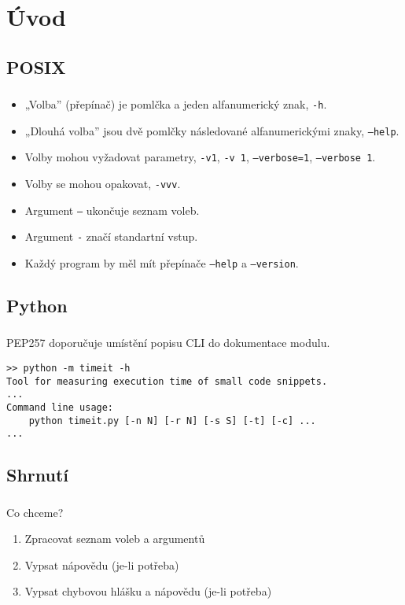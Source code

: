 \section{Úvod}
\subsection{POSIX}
\begin{frame}
\frametitle{\insertsection}
\framesubtitle{\insertsubsection}

\begin{itemize}[<+->]
\item „Volba” (přepínač) je pomlčka a jeden alfanumerický znak, \texttt{-h}.
\item „Dlouhá volba” jsou dvě pomlčky následované alfanumerickými znaky, \texttt{--help}.
\item Volby mohou vyžadovat parametry, \texttt{-v1}, \texttt{-v 1}, \texttt{--verbose=1}, \texttt{--verbose 1}.
\item Volby se mohou opakovat, \texttt{-vvv}.
\item Argument \texttt{--} ukončuje seznam voleb.
\item Argument \texttt{-} značí standartní vstup.
\item Každý program by měl mít přepínače \texttt{--help} a \texttt{--version}.
\end{itemize}
\end{frame}

\subsection{Python}
\begin{frame}[fragile]
\frametitle{\insertsection}
\framesubtitle{\insertsubsection}
PEP257 doporučuje umístění popisu CLI do dokumentace modulu.

\begin{verbatim}
>> python -m timeit -h
Tool for measuring execution time of small code snippets.
...
Command line usage:
    python timeit.py [-n N] [-r N] [-s S] [-t] [-c] ...
...
\end{verbatim}
\end{frame}

\subsection{Shrnutí}
\begin{frame}
\frametitle{\insertsection}
\framesubtitle{\insertsubsection}

Co chceme?
\begin{enumerate}[<+->]
\item Zpracovat seznam voleb a argumentů
\item Vypsat nápovědu (je-li potřeba)
\item Vypsat chybovou hlášku a nápovědu (je-li potřeba)
\end{enumerate}
\end{frame}
